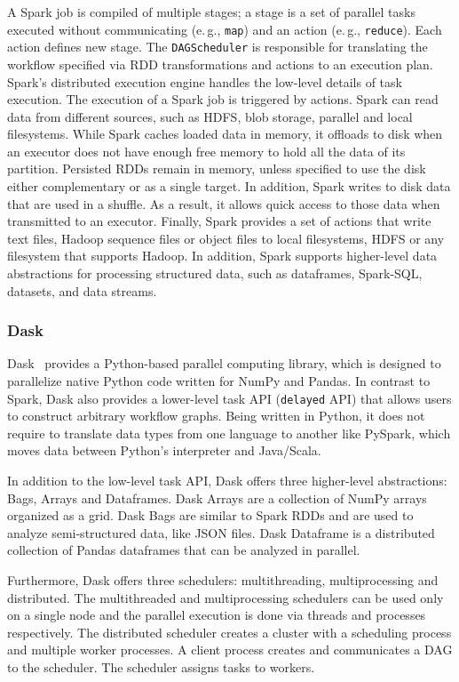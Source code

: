 A Spark job is compiled of multiple stages; a stage is a set of parallel tasks executed without communicating (e.\,g., \texttt{map}) and an action (e.\,g., \texttt{reduce}).
Each action defines new stage.
The \texttt{DAGScheduler} is responsible for translating the workflow specified via RDD transformations and actions to an execution plan.
Spark's distributed execution engine handles the low-level details of task execution.
The execution of a Spark job is triggered by actions.
Spark can read data from different sources, such as HDFS, blob storage, parallel and local filesystems.
While Spark caches loaded data in memory, it offloads to disk when an executor does not have enough free memory to hold all the data of its partition.
Persisted RDDs remain in memory, unless specified to use the disk either complementary or as a single target.
In addition, Spark writes to disk data that are used in a shuffle.
As a result, it allows quick access to those data when transmitted to an executor.
Finally, Spark provides a set of actions that write text files, Hadoop sequence files or object files to local filesystems, HDFS or any filesystem that supports Hadoop.
In addition, Spark supports higher-level data abstractions for processing structured data, such as dataframes, Spark-SQL, datasets, and data streams.

\subsubsection*{Dask}
Dask~\cite{rocklin2015dask} provides a Python-based parallel computing library, which is designed to parallelize native Python code written for NumPy and Pandas.
In contrast to Spark, Dask also provides a lower-level task API (\texttt{delayed} API) that allows users to construct arbitrary workflow graphs.
Being written in Python, it does not require to translate data 
types from one language to another like PySpark, which moves data between Python's interpreter and Java/Scala.

In addition to the low-level task API, Dask offers three higher-level abstractions: Bags, Arrays and Dataframes.
Dask Arrays are a collection of NumPy arrays organized as a grid.
Dask Bags are similar to Spark RDDs and are used to analyze semi-structured data, like JSON files.
Dask Dataframe is a distributed collection of Pandas dataframes that can be analyzed in parallel.

Furthermore, Dask offers three schedulers: multithreading, multiprocessing and distributed.
The multithreaded and multiprocessing schedulers can be used only on a single node and the parallel execution is done via threads and processes respectively.
The distributed scheduler creates a cluster with a scheduling process and multiple worker processes.
A client process creates and communicates a DAG to the scheduler.
The scheduler assigns tasks to workers.

